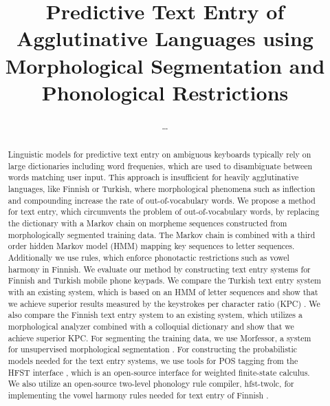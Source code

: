 \documentclass{llncs}
\begin{document}
\title{Predictive Text Entry of Agglutinative Languages using Morphological Segmentation and Phonological Restrictions}

\author{\ldots}
\institute{\ldots}

\maketitle

\begin{abstract}

Linguistic models for predictive text entry on ambiguous keyboards
typically rely on large dictionaries including word frequenies, which
are used to disambiguate between words matching user input. This
approach is insufficient for heavily agglutinative languages, like
Finnish or Turkish, where morphological phenomena such as inflection
and compounding increase the rate of out-of-vocabulary words. We
propose a method for text entry, which circumvents the problem of
out-of-vocabulary words, by replacing the dictionary with a Markov
chain on morpheme sequences constructed from morphologically segmented
training data. The Markov chain is combined with a third order hidden
Markov model (HMM) mapping key sequences to letter
sequences. Additionally we use rules, which enforce phonotactic
restrictions such as vowel harmony in Finnish. We evaluate our method
by constructing text entry systems for Finnish and Turkish mobile
phone keypads. We compare the Turkish text entry system with an
existing system, which is based on an HMM of letter sequences
\cite{Tantug:2010} and show that we achieve superior results measured
by the keystrokes per character ratio (KPC)
\cite{MacKenzie02kspc}. We also compare the Finnish text entry system
to an existing system, which utilizes a morphological analyzer
combined with a colloquial dictionary \cite{silfverberg/2011/cla} and
show that we achieve superior KPC. For segmenting the training data,
we use Morfessor, a system for unsupervised morphological segmentation
\cite{Creutz07ACMTSLP}. For constructing the probabilistic models
needed for the text entry systems, we use tools for POS tagging from
the HFST interface \cite{Silfverberg/2011}, which is an open-source
interface for weighted finite-state calculus. We also utilize an
open-source two-level phonology rule compiler, hfst-twolc, for
implementing the vowel harmony rules needed for text entry of Finnish
\cite{hfst/2011}.

\end{abstract}
\end{document}
